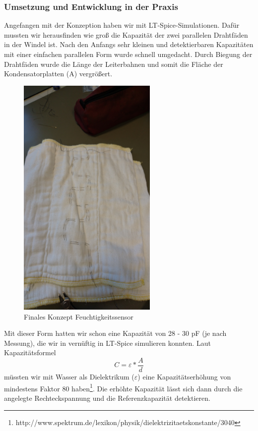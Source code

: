 \subsubsection{Umsetzung und Entwicklung in der Praxis}
Angefangen mit der Konzeption haben wir mit LT-Spice-Simulationen. Dafür mussten wir herausfinden wie groß die Kapazität der zwei parallelen Drahtfäden in der Windel ist. Nach den Anfangs sehr kleinen und detektierbaren Kapazitäten mit einer einfachen parallelen Form wurde schnell umgedacht. Durch Biegung der Drahtfäden wurde die Länge der Leiterbahnen und somit die Fläche der Kondensatorplatten (A) vergrößert.

\begin{figure}[ht]
	\centering
		\includegraphics[width=0.6\textwidth]{includes/kom/graphics/cap_sensor_final}
	\caption{Finales Konzept Feuchtigkeitssensor}
	\label{fig:cap_sensor_final}
\end{figure}

Mit dieser Form hatten wir schon eine Kapazität von 28 - 30 pF (je nach Messung), die wir in vernüftig in LT-Spice simulieren konnten. Laut Kapazitätsformel 
\[C =  \varepsilon * \frac{A}{d}\]
müssten wir mit Wasser als Dielektrikum ($\varepsilon$) eine Kapazitätserhöhung von mindestens Faktor 80 haben\footnote{http://www.spektrum.de/lexikon/physik/dielektrizitaetskonstante/3040}. Die erhöhte Kapazität lässt sich dann durch die angelegte Rechteckspannung und die Referenzkapazität detektieren.

